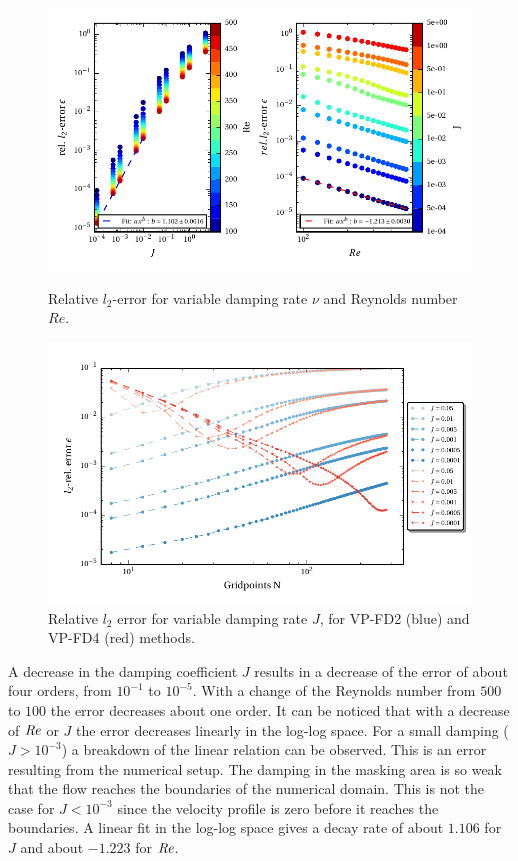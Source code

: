 \begin{figure}[!b]
  \centering
  \includegraphics{gfx/immersed_boundary/poiseuille_flow/2_vp/vp_error.pdf}  \caption{\label{fig:vp_error}
    Relative $l_2$-error for variable damping rate $\nu$ and Reynolds number $Re$.}
  \centering
  \includegraphics{gfx/immersed_boundary/poiseuille_flow/2_vp/vp_convergence.pdf}
  \caption{Relative $l_2$ error for variable damping rate $J$, for VP-FD2 (blue) and VP-FD4 (red) methods.}
    \label{fig:pflowvali_vp_conv}
\end{figure}


A decrease in the damping coefficient $J$ results in a decrease of the error of about four orders, from $10^{-1}$ to $10^{-5}$.
With a change of the Reynolds number from $500$ to $100$ the error decreases about one order.
It can be noticed that with a decrease of $\mbox{\textit{Re}}$ or $J$ the error decreases linearly in the log-log space.
For a small damping ($J>10^{-3}$) a breakdown of the linear relation can be observed.
This is an error resulting from the numerical setup.
The damping in the masking area is so weak that the flow reaches the  boundaries of the numerical domain.
This is not the case for $J<10^{-3}$ since the velocity profile is zero before it reaches the boundaries.
A linear fit in the log-log space gives a  decay rate of about $1.106$ for  $J$ and about $-1.223$ for $\mbox{\textit{Re}}$.

